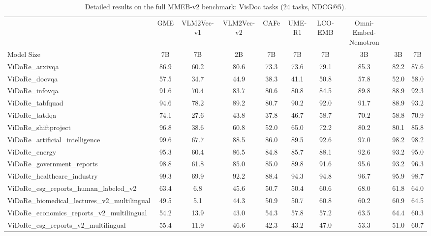 \begin{table}[!t]
    \centering
\caption{Detailed results on the full MMEB-v2 benchmark: VisDoc tasks (24 tasks, NDCG@5).}
\label{tab:full_score_visdoc}
    \renewcommand{\arraystretch}{1.1}
    \begin{adjustbox}{width=\textwidth}
    \begin{tabular}{l|ccccccccc}
        \toprule
        ~ & GME & VLM2Vec-v1 & VLM2Vec-v2 & CAFe & UME-R1 & LCO-EMB & Omni-Embed-Nemotron & \ours{} & \ours{} \\
        Model Size & 7B & 7B & 2B & 7B & 7B & 7B & 3B & 3B & 7B \\
        \midrule
        ViDoRe\_arxivqa & 86.9 & 60.2 & 80.6 & 73.3 & 73.6 & 79.1 & 85.3 & 82.2 & 87.6 \\
        ViDoRe\_docvqa & 57.5 & 34.7 & 44.9 & 38.3 & 41.1 & 50.8 & 57.8 & 52.0 & 58.0 \\
        ViDoRe\_infovqa & 91.6 & 70.4 & 83.7 & 80.6 & 80.8 & 84.5 & 89.8 & 88.9 & 92.3 \\
        ViDoRe\_tabfquad & 94.6 & 78.2 & 89.2 & 80.7 & 90.2 & 92.0 & 91.7 & 88.9 & 93.2 \\
        ViDoRe\_tatdqa & 74.1 & 27.6 & 43.8 & 37.8 & 46.7 & 58.7 & 70.2 & 58.8 & 70.9 \\
        ViDoRe\_shiftproject & 96.8 & 38.6 & 60.8 & 52.0 & 65.0 & 72.2 & 80.2 & 80.1 & 85.8 \\
        ViDoRe\_artificial\_intelligence & 99.6 & 67.7 & 88.5 & 86.0 & 89.5 & 92.6 & 97.0 & 98.2 & 98.2 \\
        ViDoRe\_energy & 95.3 & 60.4 & 86.5 & 84.8 & 85.7 & 88.1 & 92.6 & 93.2 & 95.0 \\
        ViDoRe\_government\_reports & 98.8 & 61.8 & 85.0 & 85.0 & 89.8 & 91.6 & 95.6 & 93.2 & 96.3 \\
        ViDoRe\_healthcare\_industry & 99.3 & 69.9 & 92.2 & 88.4 & 94.3 & 94.8 & 96.7 & 95.9 & 98.7 \\
        ViDoRe\_esg\_reports\_human\_labeled\_v2 & 63.4 & 6.8 & 45.6 & 50.7 & 50.4 & 60.6 & 68.0 & 61.8 & 64.0 \\
        ViDoRe\_biomedical\_lectures\_v2\_multilingual & 49.5 & 5.1 & 44.3 & 50.9 & 50.7 & 60.8 & 60.2 & 60.9 & 64.5 \\
        ViDoRe\_economics\_reports\_v2\_multilingual & 54.2 & 13.9 & 43.0 & 54.3 & 57.8 & 57.2 & 63.5 & 64.4 & 60.3 \\
        ViDoRe\_esg\_reports\_v2\_multilingual & 55.4 & 11.9 & 46.6 & 42.3 & 43.2 & 47.0 & 53.3 & 51.0 & 60.7 \\

\end{tabular}
\end{adjustbox}
\end{table}
